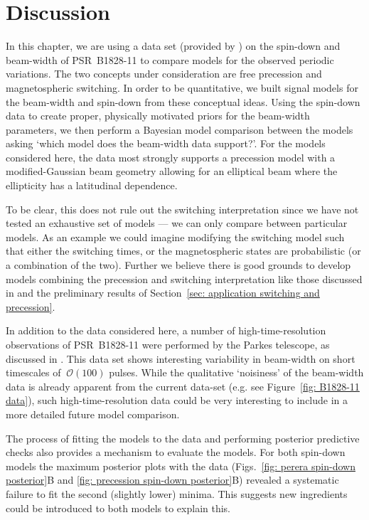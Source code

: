 \documentclass[../full_thesis/full_thesis.tex]{subfiles}
\begin{document}
\section{Discussion}
\label{sec: discussion}

In this chapter, we are using a data set (provided by \citet{Lyne2010}) on the
spin-down and beam-width of PSR~B1828-11 to compare models for the observed
periodic variations.  The two concepts under consideration are free precession
and magnetospheric switching.  In order to be quantitative, we built signal
models for the beam-width and spin-down from these conceptual ideas. Using the
spin-down data to create proper, physically motivated priors for the beam-width
parameters, we then perform a Bayesian model comparison between the models
asking `which model does the beam-width data support?'. For the models
considered here, the data most strongly supports a precession model with a
modified-Gaussian beam geometry allowing for an elliptical beam where the
ellipticity has a latitudinal dependence.

To be clear, this does not rule out the switching interpretation since we have
not tested an exhaustive set of models --- we can only compare between particular
models. As an example we could imagine modifying the switching model such that
either the switching times, or the magnetospheric states are probabilistic (or
a combination of the two).  Further we believe there is good grounds to develop
models combining the precession and switching interpretation like those
discussed in \citet{Jones2012} and the preliminary results of Section~\ref{sec:
application switching and precession}.

In addition to the data considered here, a number of
high-time-resolution observations of PSR~B1828-11 were performed
by the Parkes telescope, as discussed in \citet{Stairs2003}.
This data set shows interesting variability in beam-width on short
timescales of $~\mathcal{O}(100)$ pulses. While the qualitative `noisiness' of the
beam-width data is already apparent from the current data-set (e.g. see
Figure~\ref{fig: B1828-11 data}), such high-time-resolution data could be very interesting to
include in a more detailed future model comparison.

The process of fitting the models to the data and performing posterior
predictive checks also provides a mechanism to evaluate the models. For both
spin-down models the maximum posterior plots with the data (Figs.~\ref{fig:
perera spin-down posterior}B and \ref{fig: precession spin-down posterior}B)
revealed a systematic failure to fit the second (slightly lower) minima. This
suggests new ingredients could be introduced to both models to explain this.
\end{document}
